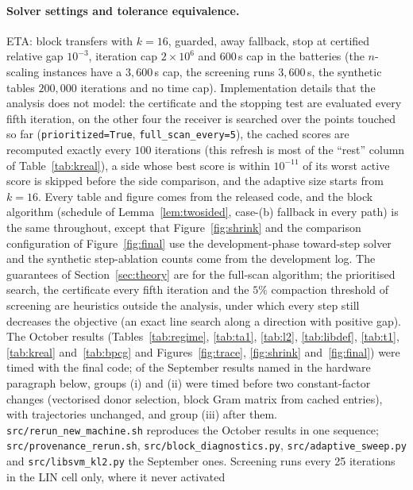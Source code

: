 \documentclass[pdflatex,sn-apa]{sn-jnl}%
\theoremstyle{thmstyleone}
\theoremstyle{thmstyletwo}
\begin{document}
\paragraph{Solver settings and tolerance equivalence.} ETA: block
transfers with $k=16$, guarded, away fallback, stop at certified
relative gap $10^{-3}$, iteration cap $2\times10^6$ and 600\,s cap in
the batteries (the $n$-scaling instances have a $3{,}600$\,s cap, the
screening runs $3{,}600$\,s, the synthetic tables $200{,}000$
iterations and no time cap). Implementation details that the analysis
does not model: the certificate and the stopping test are evaluated
every fifth iteration, on the other four the receiver is searched over
the points touched so far (\texttt{prioritized=True},
\texttt{full\_scan\_every=5}), the cached scores are recomputed
exactly every $100$ iterations (this refresh is most of the ``rest''
column of Table~\ref{tab:kreal}), a side whose best score is within
$10^{-11}$ of its worst active score is skipped before the side
comparison, and the adaptive size starts from $k=16$. Every table and figure comes from the released code, and the block
algorithm (schedule of Lemma~\ref{lem:twosided}, case-(b) fallback in
every path) is the same throughout, except that Figure~\ref{fig:shrink}
and the comparison configuration of Figure~\ref{fig:final} use the
development-phase toward-step solver and the synthetic step-ablation
counts come from the development log. The guarantees of
Section~\ref{sec:theory} are for the full-scan algorithm; the
prioritised search, the certificate every fifth iteration and the
$5\%$ compaction threshold of screening are heuristics outside the
analysis, under which every step still decreases the objective (an exact
line search along a direction with positive gap). The October results
(Tables~\ref{tab:regime}, \ref{tab:ta1}, \ref{tab:l2}, \ref{tab:libdef},
\ref{tab:t1}, \ref{tab:kreal} and~\ref{tab:bpcg} and
Figures~\ref{fig:trace}, \ref{fig:shrink} and~\ref{fig:final}) were
timed with the final code; of the September results named in the hardware paragraph below, groups
(i) and (ii) were timed before two constant-factor changes (vectorised
donor selection, block Gram matrix from cached entries), with
trajectories unchanged, and group (iii) after them. \texttt{src/rerun\_new\_machine.sh}
reproduces the October results in one sequence;
\texttt{src/provenance\_rerun.sh}, \texttt{src/block\_diagnostics.py},
\texttt{src/adaptive\_sweep.py} and \texttt{src/libsvm\_kl2.py} the
September ones. Screening
runs every 25 iterations in the LIN cell only, where it never activated
\end{document}
